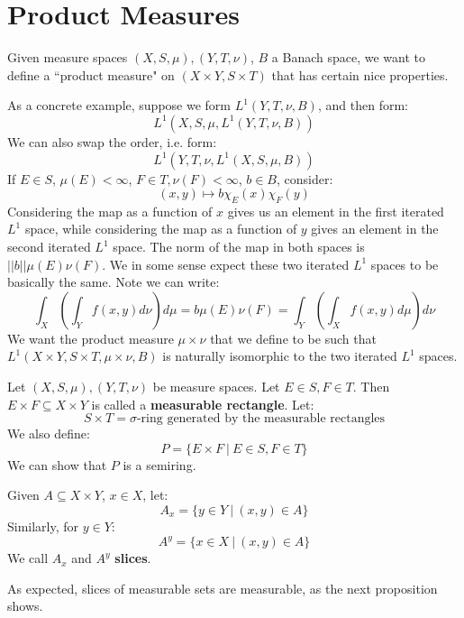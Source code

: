 \documentclass[a4paper,12pt]{report}
\newcommand{\sse} {\subseteq}
\newenvironment{definition}[1][Definition.]{\begin{trivlist}
\item[\hskip \labelsep {\bfseries #1}]}{\end{trivlist}}
\begin{document}
	\section{Product Measures}
	
	Given measure spaces $(X, S, \mu), (Y, T, \nu)$, $B$ a Banach space, we want to define a ``product measure" on $(X \times Y, S \times T)$ that has certain nice properties. 
	
	As a concrete example, suppose we form $L^1(Y, T, \nu, B)$, and then form:
	\[ L^1(X, S, \mu, L^1(Y, T, \nu, B)) \]
	We can also swap the order, i.e. form:
	\[ L^1(Y, T, \nu, L^1(X, S, \mu, B)) \]
	If $E \in S$, $\mu(E) < \infty$, $F \in T, \nu(F) < \infty$, $b \in B$, consider:
	\[ (x, y) \mapsto b \chi_E(x) \chi_F(y) \]
	Considering the map as a function of $x$ gives us an element in the first iterated $L^1$ space, while considering the map as a function of $y$ gives an element in the second iterated $L^1$ space. The norm of the map in both spaces is $||b|| \mu(E) \nu(F)$. We in some sense expect these two iterated $L^1$ spaces to be basically the same. Note we can write:
	\[ \int_X \left(\int_Y f(x, y) d\nu\right) d\mu = b\mu(E) \nu(F) = \int_Y \left(\int_X f(x, y) d\mu\right) d\nu \]
	We want the product measure $\mu \times \nu$ that we define to be such that $L^1(X \times Y, S \times T, \mu \times \nu, B)$ is naturally isomorphic to the two iterated $L^1$ spaces.
	
	\begin{definition}
	Let $(X, S, \mu), (Y, T, \nu)$ be measure spaces. Let $E \in S, F \in T$. Then $E \times F \sse X \times Y$ is called a \textbf{measurable rectangle}. Let:
	\[ S \times T = \text{$\sigma$-ring generated by the measurable rectangles} \]
	We also define:
	\[ P = \{E \times F ~|~ E \in S, F \in T \} \]
	We can show that $P$ is a semiring.
	\end{definition}
	
	\begin{definition}
	Given $A \sse X \times Y$, $x \in X$, let:
	\[ A_x = \{ y \in Y ~|~ (x, y) \in A \} \]
	Similarly, for $y \in Y$:
	\[ A^y = \{ x \in X ~|~ (x, y) \in A \} \]
	We call $A_x$ and $A^y$ \textbf{slices}.
	\end{definition}
	
	\noindent As expected, slices of measurable sets are measurable, as the next proposition shows.	
	
\end{document}
